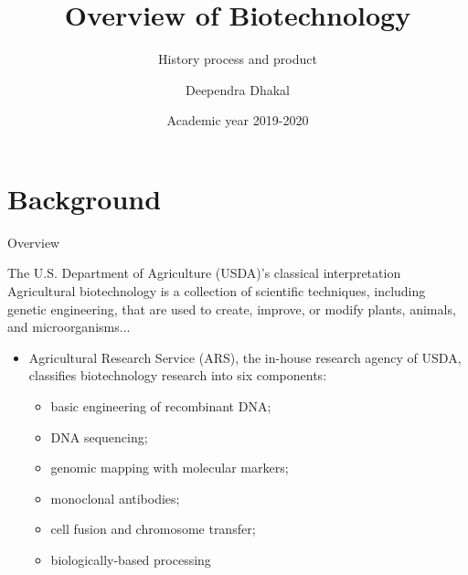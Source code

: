 \documentclass[ignorenonframetext,aspectratio=169]{beamer}
\title{Overview of Biotechnology}
\subtitle{History process and product}
\author{Deependra Dhakal}
\institute{GAASC, Baitadi \and Tribhuwan University}
\date{Academic year 2019-2020}
\providecommand{\tightlist}{%
  \setlength{\itemsep}{0pt}\setlength{\parskip}{0pt}}
\begin{document}
\frame{\titlepage}

\begin{frame}
\tableofcontents[hideallsubsections]
\end{frame}
\hypertarget{background}{%
\section{Background}\label{background}}

\begin{frame}{Overview}
\protect\hypertarget{overview}{}

\begin{block}{The U.S. Department of Agriculture (USDA)'s classical interpretation}
Agricultural biotechnology is a collection of scientific techniques, including genetic engineering, that are used to create, improve, or modify plants, animals, and microorganisms...
\end{block}

\begin{itemize}
\tightlist
\item
  Agricultural Research Service (ARS), the in-house research agency of
  USDA, classifies biotechnology research into six components:

  \begin{itemize}
  \tightlist
  \item
    basic engineering of recombinant DNA;
  \item
    DNA sequencing;
  \item
    genomic mapping with molecular markers;
  \item
    monoclonal antibodies;
  \item
    cell fusion and chromosome transfer;
  \item
    biologically-based processing
  \end{itemize}
\end{itemize}

\end{frame}
\end{document}
